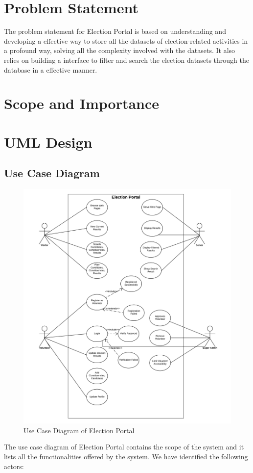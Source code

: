 \documentclass[12pt, a4paper, titlepage]{article}
\begin{document}
\section{Problem Statement}
The problem statement for Election Portal is based on understanding and developing a effective way to store all the datasets of election-related activities in a profound way, solving all the complexity involved with the datasets. It also relies on building a interface to filter and search the election datasets through the database in a effective manner.

\section{Scope and Importance}

\newpage
\section{UML Design}
\subsection{Use Case Diagram}
\begin{figure}[ht]
	\includegraphics[scale=0.6]{election_portal_use_case_diagram.png}
	\caption{Use Case Diagram of Election Portal}
\end{figure}
The use case diagram of Election Portal contains the scope of the system and it lists all the functionalities offered by the system. We have identified the following actors:
\end{document}
